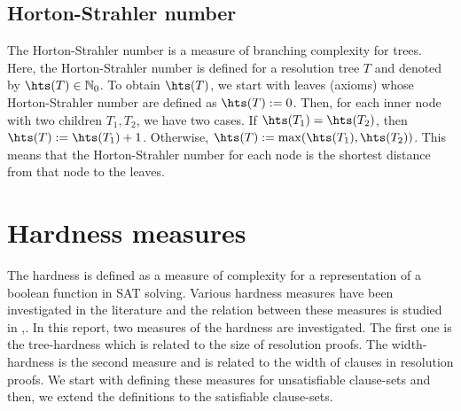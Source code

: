\documentclass[]{book}
\begin{document}
\section{Horton-Strahler number}
\label{sec:hs}

The Horton-Strahler number is a measure of branching complexity for trees. Here, the Horton-Strahler number is defined for a resolution tree $T$ and denoted by $\hts(T) \in \NNZ$. To obtain $\hts(T)$, we start with leaves (axioms) whose Horton-Strahler number are defined as $\hts(T) := 0$. Then, for each inner node with two children $T_1, T_2$, we have two cases. If $\hts(T_1)= \hts(T_2)$, then $\hts(T) := \hts(T_1)+ 1$. Otherwise, $\hts(T) := \max(\hts(T_1),\hts(T_2))$. This means that the Horton-Strahler number for each node is the shortest distance from that node to the leaves.


\chapter{Hardness measures}
\label{cha:Hardness Measures}

The hardness is defined as a measure of complexity for a representation of a boolean function in SAT solving. Various hardness measures have been investigated in the literature and the relation between these measures is studied in \cite{h5},\cite{h18}. In this report, two measures of the hardness are investigated. The first one is the tree-hardness which is related to the size of resolution proofs. The width-hardness is the second measure and is related to the width of clauses in resolution proofs. We start with defining these measures for unsatisfiable clause-sets and then, we extend the definitions to the satisfiable clause-sets. 
\end{document}
